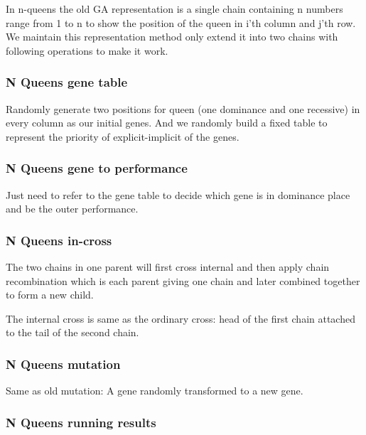 \documentclass{acmtog} %
\begin{document}
In n-queens the old GA representation is a single chain containing n numbers range from 1 to n to show the position of the queen in i'th column and j'th row. We maintain this representation method only extend it into two chains with following operations to make it work.



\subsubsection{N Queens gene table}
\label{subsubsec:nqueensgenetable}
\qquad

Randomly generate two positions for queen (one dominance and one recessive) in every column as our initial genes. And we randomly build a fixed table to represent the priority of explicit-implicit of the genes.

\subsubsection{N Queens gene to performance}
\label{subsubsec:nqueensperformance}
\qquad

Just need to refer to the gene table to decide which gene is in dominance place and be the outer performance.

\subsubsection{N Queens in-cross}
\label{subsubsec:nqueenscross}
\qquad

The two chains in one parent will first cross internal and then apply chain recombination which is each parent giving one chain and later combined together to form a new child.

The internal cross is same as the ordinary cross: head of the first chain attached to the tail of the second chain.

\subsubsection{N Queens mutation}
\label{subsubsec:nqueensmutation}
\qquad

Same as old mutation: A gene randomly transformed to a new gene.

\subsubsection{N Queens running results}
\label{subsubsec:nqueensresults}
\qquad
\end{document}

